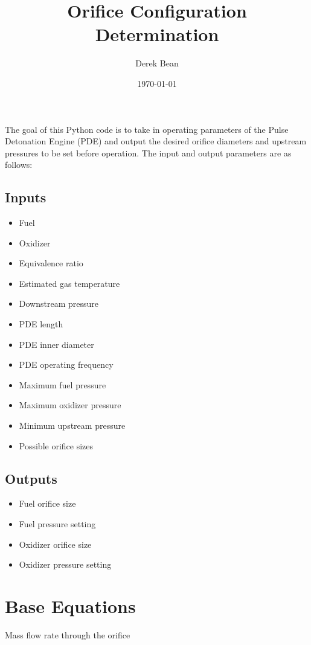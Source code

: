 \documentclass{article}
\title{Orifice Configuration Determination}
\author{Derek Bean}
\date{\today}
\begin{document}
\maketitle
The goal of this Python code is to take in operating parameters of the Pulse Detonation Engine (PDE) and output the desired orifice diameters and upstream pressures to be set before operation. The input and output parameters are as follows:
\begin{multicols}{2}
    \subsection*{Inputs}
        \begin{itemize}
            \item Fuel
            \item Oxidizer
            \item Equivalence ratio
            \item Estimated gas temperature 
            \item Downstream pressure
            \item PDE length
            \item PDE inner diameter
            \item PDE operating frequency
            \item Maximum fuel pressure
            \item Maximum oxidizer pressure
            \item Minimum upstream pressure
            \item Possible orifice sizes
            
        \end{itemize}
\columnbreak
    \subsection*{Outputs}
        \begin{itemize}
            \item Fuel orifice size
            \item Fuel pressure setting 
            \item Oxidizer orifice size
            \item Oxidizer pressure setting 
        \end{itemize}
\end{multicols}
    
\section*{Base Equations}
    Mass flow rate through the orifice 
  \printnomenclature
          
\end{document}
